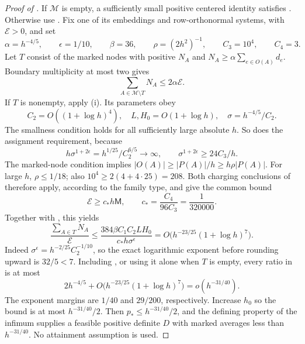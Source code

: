 \begin{proof}[Proof of ]
If $\mathcal M$ is empty, a sufficiently small positive centered
identity satisfies .  Otherwise use
.  Fix one of its embeddings and row-orthonormal
systems, with $\mathcal E>0$, and set
\[
 \alpha=h^{-4/5},\qquad \epsilon=1/10,\qquad
 \beta=36,\qquad \rho=(2h^2)^{-1},\qquad
 C_3=10^4,\qquad C_4=3.
\]
Let $T$ consist of the marked nodes with positive $N_A$ and
$N_A\ge\alpha\sum_{e\in O(A)}d_e$.
Boundary multiplicity at most two gives
\begin{equation}\label{tg:good-nodes}
 \sum_{A\in\mathcal M\setminus T}N_A\le2\alpha\mathcal E.
\end{equation}
If $T$ is nonempty, apply (i).
Its parameters obey
\[
 C_2=O((1+\log h)^4),\quad L,H_0=O(1+\log h),\quad
 \sigma=h^{-4/5}/C_2.
\]
The smallness condition holds for all sufficiently large absolute
$h$.  So does the assignment requirement, because
\[
 h\sigma^{1+2\epsilon}
 =h^{1/25}/C_2^{6/5}\longrightarrow\infty,
 \qquad \sigma^{1+2\epsilon}\ge24C_3/h.
\]
The marked-node condition implies
$|O(A)|\ge|P(A)|/h\ge h\rho|P(A)|$.
For large $h$, $\rho\le1/18$; also
$10^4\ge2(4+4\cdot25)=208$.
Both charging conclusions of  therefore apply,
according to the family type, and give the common bound
\[
 \mathcal E\ge c_*h\mathsf M,
 \qquad c_*=\frac{C_4}{96C_3}=\frac{1}{320000}.
\]
Together with , this yields
\[
 \frac{\sum_{A\in T}N_A}{\mathcal E}
 \le \frac{384\beta C_1C_2LH_0}{c_*h\sigma^\epsilon}
 =O\bigl(h^{-23/25}(1+\log h)^7\bigr).
\]
Indeed $\sigma^\epsilon=h^{-2/25}C_2^{-1/10}$, so the exact
logarithmic exponent before rounding upward is $32/5<7$.
Including , or using it alone when $T$ is empty,
every ratio in  is at most
\begin{equation}\label{tg:final-ratio}
 2h^{-4/5}+O\bigl(h^{-23/25}(1+\log h)^7\bigr)
 =o(h^{-31/40}).
\end{equation}
The exponent margins are $1/40$ and $29/200$, respectively.
Increase $h_0$ so the bound is at most $h^{-31/40}/2$.
Then $p_*\le h^{-31/40}/2$, and the defining property of the
infimum supplies a feasible positive definite $D$ with marked
averages less than $h^{-31/40}$.  No attainment assumption is used.
\end{proof}

